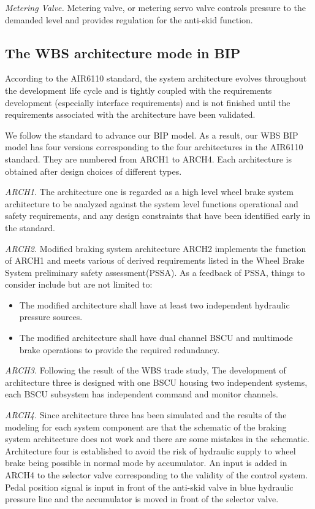 \emph{Metering Valve.} Metering valve, or metering servo valve controls pressure to the demanded level and provides regulation for the anti-skid function.

\subsection{The WBS architecture mode in BIP}

According to the AIR6110 standard, the system architecture evolves throughout the development life cycle and is tightly coupled with the requirements development (especially interface requirements) and is not finished until the requirements associated with the architecture have been validated.

We follow the standard to advance our BIP model. As a result, our WBS BIP model has four versions corresponding to the four architectures in the AIR6110 standard. They are numbered from ARCH1 to ARCH4. Each architecture is obtained after design choices of different types.

\emph{ARCH1.} The architecture one is regarded as a high level wheel brake system architecture to be analyzed against the system level functions operational and safety requirements, and any design constraints that have been identified early in the standard.

\emph{ARCH2.} Modified braking system architecture ARCH2 implements the function of ARCH1 and meets various of derived requirements listed in the Wheel Brake System preliminary safety assessment(PSSA). As a feedback of PSSA, things to consider include but are not limited to:

\begin{itemize}
\item The modified architecture shall have at least two independent hydraulic pressure sources.
\item The modified architecture shall have dual channel BSCU and multimode brake operations to provide the required redundancy.
\end{itemize}

\emph{ARCH3.} Following the result of the WBS trade study, The development of architecture three is designed with one BSCU housing two independent systems, each BSCU subsystem has independent command and monitor channels.

\emph{ARCH4.} Since architecture three has been simulated and the results of the modeling for each system component are that the schematic of the braking system architecture does not work and there are some mistakes in the schematic. Architecture four is established to avoid the risk of hydraulic supply to wheel brake being possible in normal mode by accumulator. An input is added in ARCH4 to the selector valve corresponding to the validity of the control system. Pedal position signal is input in front of the anti-skid valve in blue hydraulic pressure line and the accumulator is moved in front of the selector valve.
 